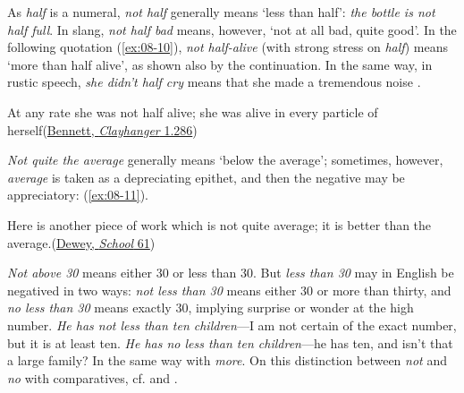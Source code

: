 As \textit{half} is a numeral, \textit{not half} generally means `less than half': \textit{the bottle is not half full}. In slang, \textit{not half bad} means, however, `not at all bad, quite good'. In the following quotation (\ref{ex:08-10}), \textit{not half-alive} (with strong stress on \textit{half}) means `more than half alive', as shown also by the continuation. In the same way, in rustic speech, \textit{she didn't half cry} means that she made a tremendous noise \citep[\href{https://www.gutenberg.org/cache/epub/47364/pg47364-images.html\#Page_117}{117}]{wright1913rustic}. 

\ea \label{ex:08-10}
At any rate she was not half alive; she was alive in every particle of herself\hfill(\href{https://archive.org/details/clayhanger01benngoog/page/238/mode/2up?q=%22rate+she+was+not+half%22&view=theater}{Bennett, \textit{Clayhanger} 1.286})
\z

\textit{Not quite the average} generally means `below the average'; sometimes, however, \textit{average} is taken as a depreciating epithet, and then the negative may be appreciatory: (\ref{ex:08-11}).

\ea \label{ex:08-11}
Here is another piece of work which is not quite average; it is better than the average.\hfill(\href{https://archive.org/details/schoolsociety00dewerich/page/n71/mode/2up?q=%22here+is+another+piece+of+work%22&view=theater}{Dewey, \textit{School} 61})
\z
{}

\textit{Not above 30} means either 30 or less than 30. But \textit{less than 30} may in English be negatived in two ways: \textit{not less than 30} means either 30 or more than thirty, and \textit{no less than 30} means exactly 30, implying surprise or wonder at the high number. \textit{He has not less than ten children}---I am not certain of the exact number, but it is at least ten. \textit{He has no less than ten children}---he has ten, and isn't that a large family? In the same way with \textit{more}. On this distinction between \textit{not} and \textit{no} with comparatives, cf. \citet[\href{https://archive.org/details/jespersen-1954-a-modern-english-grammar-on-historical-principles-part-ii-syntax-first-volume/page/434/mode/2up?view=theater}{16.83ff}]{jespersenMEG2} and \citet[\href{https://archive.org/details/studiesinenglis00stofgoog/page/n106/mode/2up?view=theater}{87ff}]{stoffel1894studies}.%

